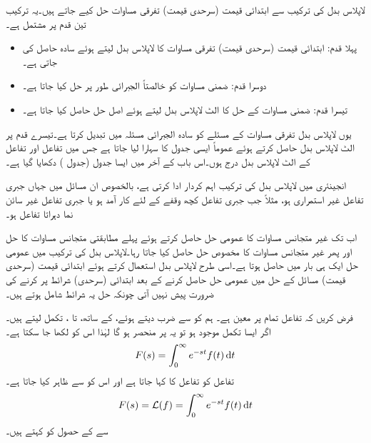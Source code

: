 لاپلاس بدل کی ترکیب سے ابتدائی قیمت (سرحدی قیمت) تفرقی مساوات حل کیے جاتے ہیں۔یہ ترکیب تین قدم پر مشتمل ہے۔
\begin{itemize}
\item
پہلا قدم: ابتدائی قیمت (سرحدی قیمت) تفرقی مساوات کا لاپلاس بدل لیتے ہوئے سادہ  حاصل کی جاتی ہے۔
\item
دوسرا قدم:  ضمنی مساوات کو خالصتاً الجبرائی طور پر حل کیا جاتا ہے۔
\item
تیسرا قدم: ضمنی مساوات کے حل کا الٹ لاپلاس بدل لیتے ہوئے اصل حل حاصل کیا جاتا ہے۔
\end{itemize}  

یوں لاپلاس بدل تفرقی مساوات کے مسئلے کو سادہ الجبرائی مسئلہ میں تبدیل کرتا ہے۔تیسرے قدم پر الٹ لاپلاس بدل حاصل کرتے ہوئے عموماً ایسی جدول کا سہارا لیا جاتا ہے جس  میں تفاعل اور تفاعل کے الٹ لاپلاس بدل درج ہوں۔اس باب کے آخر میں ایسا جدول (جدول ) دکھایا گیا ہے۔  

انجینئری میں لاپلاس بدل کی ترکیب اہم کردار ادا کرتی ہے، بالخصوص ان مسائل میں جہاں جبری تفاعل غیر استمراری ہو، مثلاً جب جبری تفاعل کچھ وقفے کے لئے کار آمد ہو یا جبری تفاعل غیر سائن نما دہراتا تفاعل ہو۔

اب تک غیر متجانس مساوات کا عمومی حل حاصل کرتے ہوئے پہلے مطابقتی متجانس مساوات کا حل اور پھر غیر متجانس مساوات کا مخصوص حل حاصل کیا جاتا رہا۔لاپلاس بدل کی ترکیب میں عمومی حل ایک ہی بار میں حاصل ہوتا ہے۔اسی طرح لاپلاس بدل استعمال کرتے ہوئے ابتدائی قیمت (سرحدی قیمت) مسائل کے حل میں عمومی حل حاصل کرنے کے بعد ابتدائی (سرحدی) شرائط پر کرنے کی ضرورت پیش نہیں آتی چونکہ حل یہ شرائط شامل ہوتے ہیں۔

فرض کریں کہ تفاعل  تمام  پر معین ہے۔ ہم  کو  سے ضرب دیتے ہوئے،   کے ساتھ،  تا ، تکمل لیتے ہیں۔ اگر ایسا تکمل موجود ہو تو یہ  پر منحصر ہو گا لہٰذا اس کو  لکھا جا سکتا ہے۔
\begin{align}
F(s)=\int_{0}^{\infty}e^{-st}f(t)\dif t
\end{align} 
تفاعل  کو تفاعل  کا  کہا جاتا ہے اور اس کو
  سے ظاہر کیا جاتا ہے۔
\begin{align}\label{مساوات_لاپلاس_بدل_الف}
F(s)=\Laplace(f)=\int_{0}^{\infty} e^{-st} f(t)\dif t
\end{align}
 سے  کے حصول کو  کہتے ہیں۔

